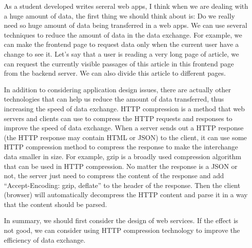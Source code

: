 \documentclass[12pt, a4paper]{article}
\begin{document}
As a student developed writes sereral web apps, I think when we are dealing with a huge amount of data, the first thing we should think about is: Do we really need so huge amount of data being transferred in a web apps. We can use several techniques to reduce the amount of data in the data exchange. For example, we can make the frontend page to request data only when the current user have a change to see it. Let's say that a user is reading a very long page of article, we can request the currently visible passages of this article in this frontend page from the backend server. We can also divide this article to different pages.

In addition to considering application design issues, there are actually other technologies that can help us reduce the amount of data transferred, thus increasing the speed of data exchange. HTTP compression is a method that web servers and clients can use to compress the HTTP requests and responses to improve the speed of data exchange.\cite{wiki2} When a server sends out a HTTP response (the HTTP response may contain HTML or JSON) to the client, it can use some HTTP compression method to compress the response to make the interchange data smaller in size. For example, gzip is a broadly used compression algorithm that can be used in HTTP compression. No matter the response is a JSON or not, the server just need to compress the content of the response and add ``Accept-Encoding: gzip, deflate'' to the header of the response. Then the client (browser) will automatically decompress the HTTP content and parse it in a way that the content should be parsed.

In summary, we should first consider the design of web services. If the effect is not good, we can consider using HTTP compression technology to improve the efficiency of data exchange.


\end{document}
